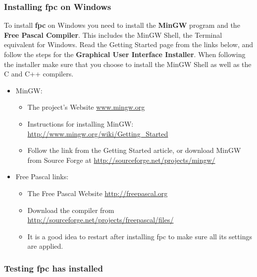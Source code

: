 
\subsubsection{Installing fpc on Windows} %
\label{ssub:installing_fpc_on_windows}

To install \textbf{fpc} on Windows you need to install the \textbf{MinGW} program and the \textbf{Free Pascal Compiler}. This includes the MinGW Shell, the Terminal equivalent for Windows. Read the Getting Started page from the links below, and follow the steps for the \textbf{Graphical User Interface Installer}. When following the installer make sure that you choose to install the MinGW Shell as well as the C and C++ compilers.

\begin{itemize}
  \item MinGW:
  \begin{itemize}
    \item The project's Website \url{www.mingw.org}
    \item Instructions for installing MinGW: \url{http://www.mingw.org/wiki/Getting_Started}
    \item Follow the link from the Getting Started article, or download MinGW from Source Forge at \url{http://sourceforge.net/projects/mingw/}
  \end{itemize}

  \item Free Pascal links:
  \begin{itemize}
    \item The Free Pascal Website \url{http://freepascal.org}
    \item Download the compiler from \url{http://sourceforge.net/projects/freepascal/files/} 
    \item It is a good idea to restart after installing fpc to make sure all its settings are applied.
  \end{itemize}
  
\end{itemize}



\subsubsection{Testing fpc has installed} %
\label{ssub:testing_your_install_fpc}

